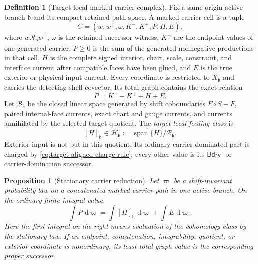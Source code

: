 \documentclass[11pt]{article}
\numberwithin{section}{part}
\theoremstyle{plain}
\newtheorem{proposition}[proposition]{Proposition}
\theoremstyle{definition}
\newtheorem{definition}[definition]{Definition}
\theoremstyle{remark}
\newcommand{\dd}{\,\mathrm d}
\newcommand{\Bdry}{\mathsf{Bdry}}
\begin{document}
\begin{definition}[Target-local marked carrier complex]
\label{def:target-local-marked-carrier-complex}
Fix a same-origin active branch \(\mathfrak b\) and its compact retained path
space.  A marked carrier cell is a tuple
\[
 C=(w,w^+,\omega,K^-,K^+,P,H,E),
\]
where \(w\mathcal R_\eta w^+\), \(\omega\) is the retained successor witness,
\(K^\pm\) are the endpoint values of one generated carrier, \(P\ge0\) is the
sum of the generated nonnegative productions in that cell, \(H\) is the
complete signed interior, chart, scale, constraint, and interface current
after compatible faces have been glued, and \(E\) is the true exterior or
physical-input current.  Every coordinate is restricted to
\(X_{\mathfrak b}\) and carries the detecting shell covector.  Its total graph
contains the exact relation
\begin{equation}
 \label{eq:target-local-marked-carrier}
 P=K^- -K^+ +H+E.
\end{equation}
Let \(\mathscr B_{\mathfrak b}\) be the closed linear space generated by
shift coboundaries \(F\circ S-F\), paired internal-face currents, exact chart
and gauge currents, and currents annihilated by the selected target quotient.
The \emph{target-local feeding class} is
\begin{equation}
 \label{eq:target-local-feeding-cohomology}
 [H]_{\mathfrak b}
 \in
 \mathscr H_{\mathfrak b}
 :=\overline{\operatorname{span}\{H\}}/\mathscr B_{\mathfrak b}.
\end{equation}
Exterior input is not put in this quotient.  Its ordinary carrier-dominated
part is charged by \eqref{eq:target-aligned-charge-rule}; every other value is
its \(\Bdry\)- or carrier-domination successor.
\end{definition}

\begin{proposition}[Stationary carrier reduction]
\label{prop:stationary-carrier-reduction}
Let \(\varpi\) be a shift-invariant probability law on a concatenated marked
carrier path in one active branch.  On the ordinary finite-integral value,
\begin{equation}
 \label{eq:stationary-carrier-cohomology}
 \int P\,\dd\varpi
 =\int [H]_{\mathfrak b}\,\dd\varpi
  +\int E\,\dd\varpi.
\end{equation}
Here the first integral on the right means evaluation of the cohomology class
by the stationary law.  If an endpoint, concatenation, integrability,
quotient, or exterior coordinate is nonordinary, its least total-graph value
is the corresponding proper successor.
\end{proposition}
\end{document}
